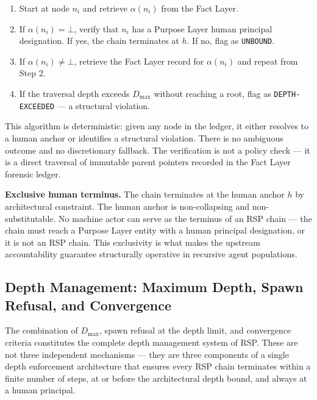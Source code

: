 \begin{algorithm}[H]
\caption{Chain Termination Verification}
\label{alg:chain-verification}
\begin{enumerate}
    \item Start at node $n_i$ and retrieve $\alpha(n_i)$ from the Fact Layer.
    \item If $\alpha(n_i) = \bot$, verify that $n_i$ has a Purpose Layer human principal designation. If yes, the chain terminates at $h$. If no, flag as \texttt{UNBOUND}.
    \item If $\alpha(n_i) \neq \bot$, retrieve the Fact Layer record for $\alpha(n_i)$ and repeat from Step 2.
    \item If the traversal depth exceeds $D_{\max}$ without reaching a root, flag as \texttt{DEPTH-EXCEEDED} — a structural violation.
\end{enumerate}
\end{algorithm}

This algorithm is deterministic: given any node in the ledger, it either resolves to a human anchor or identifies a structural violation. There is no ambiguous outcome and no discretionary fallback. The verification is not a policy check — it is a direct traversal of immutable parent pointers recorded in the Fact Layer forensic ledger.

\medskip
\noindent\textbf{Exclusive human terminus.} The chain terminates at the human anchor $h$ by architectural constraint. The human anchor is non-collapsing and non-substitutable. No machine actor can serve as the terminus of an RSP chain — the chain must reach a Purpose Layer entity with a human principal designation, or it is not an RSP chain. This exclusivity is what makes the \bxthree{} upstream accountability guarantee structurally operative in recursive agent populations.

\subsection{Depth Management: Maximum Depth, Spawn Refusal, and Convergence}
\label{sec:rs-depth-management}

The combination of $D_{\max}$, spawn refusal at the depth limit, and convergence criteria constitutes the complete depth management system of RSP. These are not three independent mechanisms — they are three components of a single depth enforcement architecture that ensures every RSP chain terminates within a finite number of steps, at or before the architectural depth bound, and always at a human principal.

